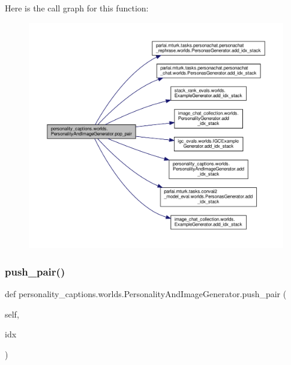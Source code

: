 Here is the call graph for this function\+:
\nopagebreak
\begin{figure}[H]
\begin{center}
\leavevmode
\includegraphics[width=350pt]{classpersonality__captions_1_1worlds_1_1PersonalityAndImageGenerator_ade0cb023a2efc492a3eedea9c670ef51_cgraph}
\end{center}
\end{figure}
\mbox{\label{classpersonality__captions_1_1worlds_1_1PersonalityAndImageGenerator_a9d4d745f2bc678ff0cae5048f0efc047}} 
\subsubsection{\texorpdfstring{push\+\_\+pair()}{push\_pair()}}
{\footnotesize\ttfamily def personality\+\_\+captions.\+worlds.\+Personality\+And\+Image\+Generator.\+push\+\_\+pair (\begin{DoxyParamCaption}\item[{}]{self,  }\item[{}]{idx }\end{DoxyParamCaption})}




